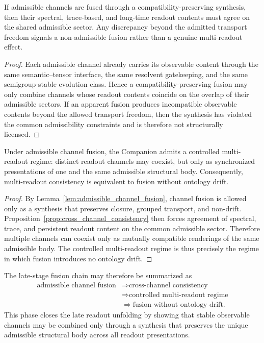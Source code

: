 \begin{proposition}\label{prop:cross_channel_consistency}
If admissible channels are fused through a compatibility-preserving synthesis, then their spectral, trace-based, and long-time readout contents must agree on the shared admissible sector. Any discrepancy beyond the admitted transport freedom signals a non-admissible fusion rather than a genuine multi-readout effect.
\end{proposition}
\begin{proof}
Each admissible channel already carries its observable content through the same semantic--tensor interface, the same resolvent gatekeeping, and the same semigroup-stable evolution class. Hence a compatibility-preserving fusion may only combine channels whose readout contents coincide on the overlap of their admissible sectors. If an apparent fusion produces incompatible observable contents beyond the allowed transport freedom, then the synthesis has violated the common admissibility constraints and is therefore not structurally licensed.
\end{proof}

\begin{theorem}\label{thm:multi_readout_consistency}
Under admissible channel fusion, the Companion admits a controlled multi-readout regime: distinct readout channels may coexist, but only as synchronized presentations of one and the same admissible structural body. Consequently, multi-readout consistency is equivalent to fusion without ontology drift.
\end{theorem}
\begin{proof}
By Lemma~\ref{lem:admissible_channel_fusion}, channel fusion is allowed only as a synthesis that preserves closure, grouped transport, and non-drift. Proposition~\ref{prop:cross_channel_consistency} then forces agreement of spectral, trace, and persistent readout content on the common admissible sector. Therefore multiple channels can coexist only as mutually compatible renderings of the same admissible body. The controlled multi-readout regime is thus precisely the regime in which fusion introduces no ontology drift.
\end{proof}

\begin{corollary}\label{cor:fusion_to_consistency_chain}
The late-stage fusion chain may therefore be summarized as
\[
\begin{aligned}
\text{admissible channel fusion}
&\Longrightarrow \text{cross-channel consistency}\\
&\Longrightarrow \text{controlled multi-readout regime}\\
&\Longrightarrow \text{fusion without ontology drift}.
\end{aligned}
\]
This phase closes the late readout unfolding by showing that stable observable channels may be combined only through a synthesis that preserves the unique admissible structural body across all readout presentations.
\end{corollary}


